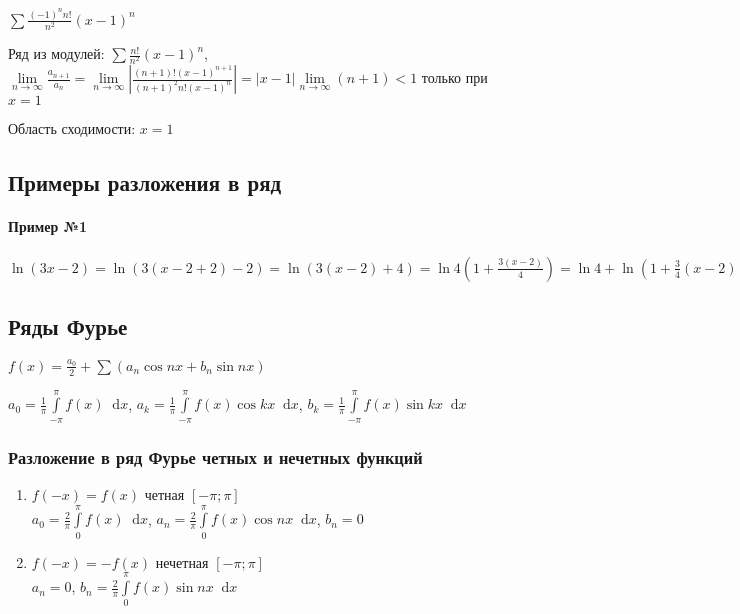 \documentclass{article}
\newcommand*\diff{\mathop{}\!\mathrm{d}}
\begin{document}
$\sum \frac{(-1)^{n} n!}{n^2} (x - 1)^{n}$

Ряд из модулей: $\sum \frac{n!}{n^2} (x - 1)^{n}$, $\lim\limits_{n \to \infty} \frac{a_{n + 1}}{a_{n}} = \lim\limits_{n \to \infty} | \frac{(n + 1)! (x - 1)^{n + 1}}{(n + 1)^2 n! (x - 1)^{n}} | = |x - 1| \lim\limits_{n \to \infty} (n + 1) < 1$ только при $x = 1$

Область сходимости: $x = 1$

\subsection{Примеры разложения в ряд}

\paragraph{Пример №1}

$\ln (3 x - 2) = \ln (3 (x - 2 + 2) - 2) = \ln (3 (x - 2) + 4) = \ln 4 (1 + \frac{3 ( x - 2)}{4}) = \ln 4 + \ln (1 + \frac{3}{4}(x - 2)) = \ln 4 + \frac{3}{4} (x - 2) - \frac{1}{2} (\frac{3}{4} (x - 2))^2 + \frac{1}{3} (\frac{3}{4} (x - 2))^3 - \dots$

\pagebreak
\subsection{Ряды Фурье}

$f(x) = \frac{a_0}{2} + \sum (a_{n} \cos n x + b_{n} \sin n x)$

$a_0 = \frac{1}{\pi} \int\limits_{-\pi}^{\pi} f(x) \diff x$, $a_{k} = \frac{1}{\pi} \int\limits_{-\pi}^{\pi} f(x) \cos k x \diff x$, $b_{k} = \frac{1}{\pi} \int\limits_{-\pi}^{\pi} f(x) \sin k x \diff x$

\subsubsection{Разложение в ряд Фурье четных и нечетных функций}

\begin{enumerate}
    \item $f(-x) = f(x)$ четная $[-\pi; \pi]$ \\
    $a_0 = \frac{2}{\pi} \int\limits_{0}^{\pi} f(x) \diff x$, $a_{n} = \frac{2}{\pi} \int\limits_{0}^{\pi} f(x) \cos n x \diff x$, $b_{n} = 0$
    \item $f(-x) = - f(x)$ нечетная $[-\pi; \pi]$ \\
    $a_{n} = 0$, $b_{n} = \frac{2}{\pi} \int\limits_{0}^{\pi} f(x) \sin n x \diff x$
\end{enumerate}
\end{document}
